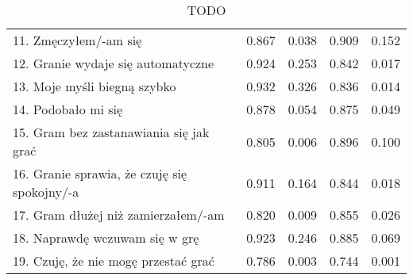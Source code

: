 \begin{table}[h!]
\begin{center}
\begin{tabular}{|m{10em}|m{5em}|m{5em}|m{5em}|m{5em}|}
            11. Zmęczyłem/-am się                                             & 0.867                       & 0.038            & 0.909                   & 0.152        \\
            12. Granie wydaje się automatyczne                                & 0.924                       & 0.253            & 0.842                   & 0.017        \\
            13. Moje myśli \newline biegną szybko                             & 0.932                       & 0.326            & 0.836                   & 0.014        \\
            14. Podobało mi się                                               & 0.878                       & 0.054            & 0.875                   & 0.049        \\
            15. Gram bez zastanawiania się jak grać                           & 0.805                       & 0.006            & 0.896                   & 0.100        \\
            16. Granie sprawia, \newline że czuję się spokojny/-a             & 0.911                       & 0.164            & 0.844                   & 0.018        \\
            17. Gram dłużej \newline niż zamierzałem/-am                      & 0.820                       & 0.009            & 0.855                   & 0.026        \\
            18. Naprawdę wczuwam się w grę                                    & 0.923                       & 0.246            & 0.885                   & 0.069        \\
            19. Czuję, że nie mogę przestać grać                              & 0.786                       & 0.003            & 0.744                   & 0.001        \\
            \hline
        \end{tabular}
    \end{center}
    \caption{TODO}\label{tab1:ch7_10}
\end{table}

